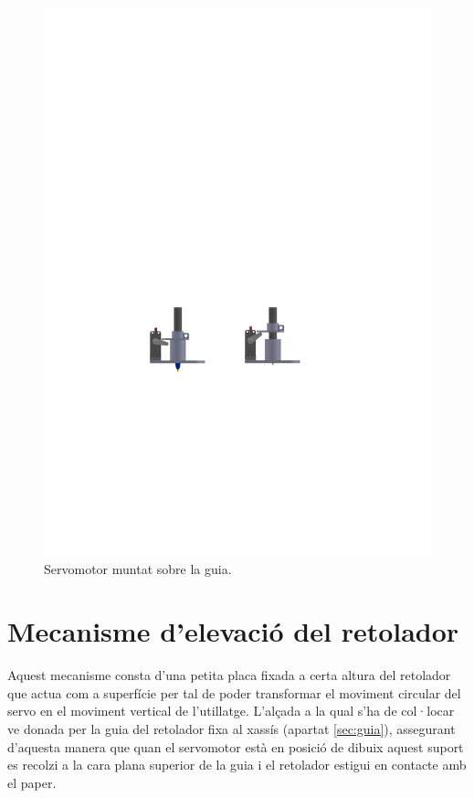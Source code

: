 \begin{figure}[H]
	\centering
	\includegraphics{GuiaServo}
	\caption{Servomotor muntat sobre la guia.}
	\label{fig:guiaservo}
\end{figure}


\section{Mecanisme d'elevació del retolador} \label{sec:suportmobil}

Aquest mecanisme consta d’una petita placa fixada a certa altura del retolador que actua com a superfície per tal de poder transformar el moviment circular del servo en el moviment vertical de l’utillatge. L’alçada a la qual s’ha de col·locar ve donada per la guia del retolador fixa al xassís (apartat \ref{sec:guia}), assegurant d'aquesta manera que quan el servomotor està en posició de dibuix aquest suport es recolzi a la cara plana superior de la guia i el retolador estigui en contacte amb el paper. 

